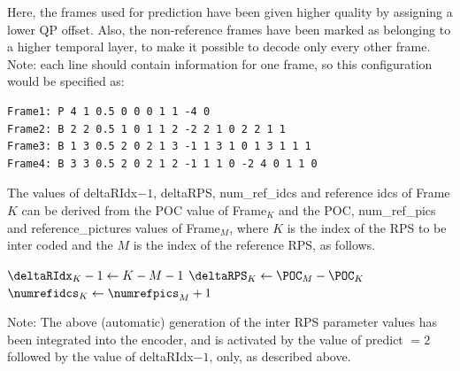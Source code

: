\documentclass[a4paper,11pt]{jctvcdoc}
\begin{document}
Here, the frames used for prediction have been given higher
quality by assigning a lower QP offset. Also, the non-reference
frames have been marked as belonging to a higher temporal layer,
to make it possible to decode only every other frame. Note: each
line should contain information for one frame, so this
configuration would be specified as:

\begin{verbatim}
Frame1: P 4 1 0.5 0 0 0 1 1 -4 0
Frame2: B 2 2 0.5 1 0 1 1 2 -2 2 1 0 2 2 1 1
Frame3: B 1 3 0.5 2 0 2 1 3 -1 1 3 1 0 1 3 1 1 1
Frame4: B 3 3 0.5 2 0 2 1 2 -1 1 1 0 -2 4 0 1 1 0
\end{verbatim}

The values of deltaRIdx$-1$, deltaRPS, num_ref_idcs and reference
idcs of Frame$K$ can be derived from the POC value of Frame$_K$ and
the POC, num_ref_pics and reference_pictures values of Frame$_M$, where
$K$ is the index of the RPS to be inter coded and the $M$ is the
index of the reference RPS, as follows.

\setlength{\algomargin}{2em}
\begin{algorithm}[h]

    $\deltaRIdx_K - 1  \leftarrow  K - M - 1$ \;
    $\deltaRPS_K       \leftarrow  \POC_M - \POC_K$ \;
    $\numrefidcs_K     \leftarrow  \numrefpics_M + 1$ \;


\end{algorithm}

Note: The above (automatic) generation of the inter RPS parameter
values has been integrated into the encoder, and is activated by
the value of predict $= 2$ followed by the value of deltaRIdx$-1$,
only, as described above.
\end{document}
